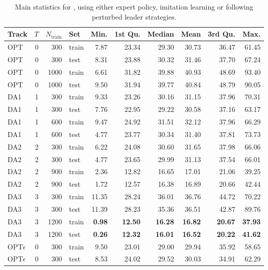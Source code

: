 \begin{table}[t]
\caption{Main statistics for  \namerho, using either expert
   policy, imitation learning or following perturbed leader 
   strategies.}\label{tbl:IL:stats} 
\centering
\begin{tabular}{lrrlrrrrrr}
  \toprule
  Track & $T$ & $N_{\text{train}}$ & Set & Min. & 1st Qu. & Median & Mean & 
  3rd Qu. & Max. \\ 
  \midrule
  OPT & 0 & 300 & train & 7.87 & 23.34 & 29.30 & 30.73 & 36.47 & 61.45 \\ 
  OPT & 0 & 300 & test & 8.31 & 23.88 & 30.32 & 31.46 & 37.70 & 67.24 \\ 
  OPT & 0 & 1000 & train & 6.61 & 31.82 & 39.88 & 40.93 & 48.69 & 93.40 \\ 
  OPT & 0 & 1000 & test & 9.50 & 31.94 & 39.77 & 40.84 & 48.79 & 90.05 \\ 
  DA1 & 1 & 300 & train & 9.33 & 23.26 & 30.16 & 31.15 & 37.96 & 70.31 \\ 
  DA1 & 1 & 300 & test & 7.76 & 22.95 & 29.22 & 30.58 & 37.16 & 63.17 \\ 
  DA1 & 1 & 600 & train & 9.47 & 24.92 & 31.51 & 32.12 & 37.96 & 66.29 \\ 
  DA1 & 1 & 600 & test & 4.77 & 23.77 & 30.34 & 31.40 & 37.81 & 73.73 \\ 
  DA2 & 2 & 300 & train & 6.22 & 24.08 & 30.60 & 31.65 & 37.98 & 66.06 \\ 
  DA2 & 2 & 300 & test & 4.77 & 23.65 & 29.99 & 31.13 & 37.54 & 66.01 \\ 
  DA2 & 2 & 900 & train & 2.36 & 12.82 & 16.65 & 17.01 & 21.06 & 39.25 \\ 
  DA2 & 2 & 900 & test & 1.72 & 12.57 & 16.38 & 16.89 & 20.66 & 42.44 \\ 
  DA3 & 3 & 300 & train & 11.35 & 28.24 & 36.01 & 36.76 & 44.72 & 70.22 \\ 
  DA3 & 3 & 300 & test & 11.39 & 28.23 & 35.36 & 36.51 & 42.87 & 89.76 \\ 
  DA3 & 3 & 1200 & train & \textbf{0.98} & \textbf{12.50} & \textbf{16.28} & 
  \textbf{16.82} & \textbf{20.67} & \textbf{37.93} \\ 
  DA3 & 3 & 1200 & test & \textbf{0.26} & \textbf{12.32} & \textbf{16.01} & 
  \textbf{16.52} & \textbf{20.22} & \textbf{41.62} \\ 
  OPT$\epsilon$ & 0 & 300 & train & 9.50 & 23.01 & 29.00 & 29.94 & 35.92 & 
  58.65 \\ 
  OPT$\epsilon$ & 0 & 300 & test & 8.53 & 24.02 & 29.52 & 30.03 & 34.91 & 
  62.29 \\ 
  \bottomrule
\end{tabular}
\end{table}